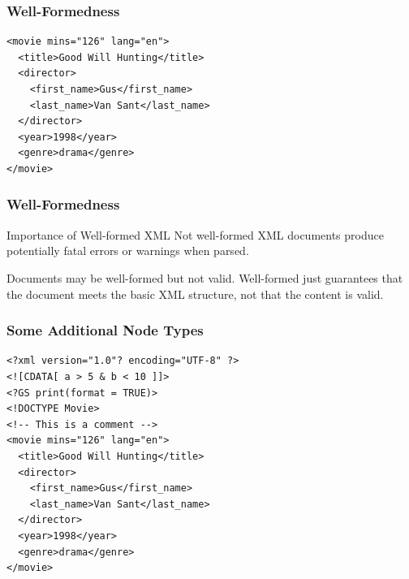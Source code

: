 \documentclass[svgnames]{beamer}
\begin{document}

\begin{frame}[fragile]
\frametitle{Well-Formedness}

\begin{verbatim}
<movie mins="126" lang="en">
  <title>Good Will Hunting</title>
  <director>
    <first_name>Gus</first_name>
    <last_name>Van Sant</last_name>
  </director>
  <year>1998</year>
  <genre>drama</genre>
</movie>
\end{verbatim}

\end{frame}


\begin{frame}
\frametitle{Well-Formedness}

\begin{block}{Importance of Well-formed XML}
Not well-formed XML documents produce potentially fatal errors or warnings when parsed.

\bigskip

Documents may be well-formed but not valid. Well-formed just guarantees that the document meets the basic XML structure, not that the content is valid.
\end{block}

\end{frame}



\begin{frame}[fragile]
\frametitle{Some Additional Node Types}

{ \small
\begin{verbatim}
<?xml version="1.0"? encoding="UTF-8" ?>
<![CDATA[ a > 5 & b < 10 ]]>
<?GS print(format = TRUE)>
<!DOCTYPE Movie>
<!-- This is a comment -->
<movie mins="126" lang="en">
  <title>Good Will Hunting</title>
  <director>
    <first_name>Gus</first_name>
    <last_name>Van Sant</last_name>
  </director>
  <year>1998</year>
  <genre>drama</genre>
</movie>
\end{verbatim}
}

\end{frame}

\end{document}
